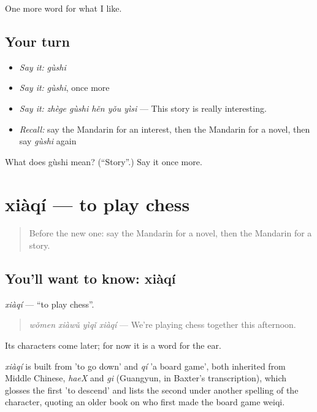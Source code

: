 \begin{grammarlens}[title={What you've built}]
One more word for what I like.
\end{grammarlens}

\subsection*{Your turn}
\begin{itemize}
\raggedright
  \item \emph{Say it:} \emph{gùshi}
  \item \emph{Say it:} \emph{gùshi}, once more
  \item \emph{Say it:} \emph{zhège gùshi hěn yǒu yìsi} — This story is really interesting.
  \item \emph{Recall:} say the Mandarin for an interest, then the Mandarin for a novel, then say \emph{gùshi} again
\end{itemize}

\begin{tcolorbox}[breakable,colback=teal!4,colframe=teal!35!black,title={Before you move on}]
What does gùshi mean? (\textquotedblleft{}Story\textquotedblright{}.) Say it once more.
\end{tcolorbox}
\section[xiàqí]{xiàqí — to play chess}

\label{lesson:ZH-C250-xiaqi}



\begin{quote}
Before the new one: say the Mandarin for a novel, then the Mandarin for a story.
\end{quote}

\subsection*{You'll want to know: xiàqí}
\emph{xiàqí} — \textquotedblleft{}to play chess\textquotedblright{}.

\begin{quote}
\emph{wǒmen xiàwǔ yìqǐ xiàqí} — We're playing chess together this afternoon.
\end{quote}

Its characters come later; for now it is a word for the ear.

\begin{cousinweb}
\emph{xiàqí} is built from  'to go down' and \emph{qí} 'a board game', both inherited from Middle Chinese, \emph{haeX} and \emph{gi} (Guangyun, in Baxter's transcription), which glosses the first 'to descend' and lists the second under another spelling of the character, quoting an older book on who first made the board game weiqi.
\end{cousinweb}

